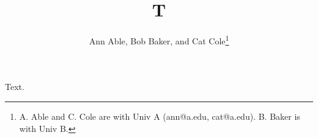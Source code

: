 \documentclass{article}
\begin{document}
\title{T}
\author{Ann Able, Bob Baker, and Cat Cole\thanks{A. Able and C. Cole are with Univ A (ann@a.edu, cat@a.edu). B. Baker is with Univ B.}}
\maketitle
Text.
\end{document}
